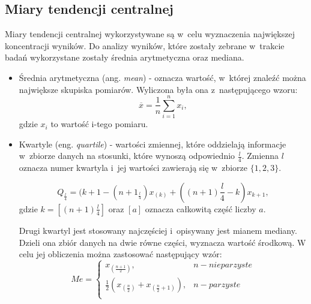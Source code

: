 \documentclass[a4paper,12pt,numbers=noenddot]{report}
\begin{document}
\subsection{Miary tendencji centralnej}
Miary tendencji centralnej wykorzystywane są w~celu wyznaczenia największej koncentracji wyników. Do analizy wyników, które zostały zebrane w~trakcie badań wykorzystane zostały średnia arytmetyczna oraz mediana.
\begin{itemize}
\item
Średnia arytmetyczna (ang. \textit{mean}) - oznacza wartość, w~której znaleźć można największe skupiska pomiarów. 
Wyliczona była ona z~następującego wzoru:
\begin{equation}
\label{eq_mean}
\overline{x} = \frac{1}{n}\sum_{i=1}^{n}x_{i},
\end{equation}
gdzie $x_{i}$ to wartość i-tego pomiaru.

\item
Kwartyle (eng. \textit{quartile}) - wartości zmiennej, które oddzielają informacje w~zbiorze danych na stosunki, które wynoszą odpowiednio $\frac{l}{4}$. Zmienna $l$ oznacza numer kwartyla i~jej wartości zawierają się w~zbiorze  $\{1,2,3\}$.

\begin{equation}
\label{eq_quart}
Q_{\frac{l}{4}}=(k+1-(n+1_\frac{l}{4})x_{(k)}+((n+1)\frac{l}{4}-k)x_{k+1},
\end{equation}
gdzie $k = [(n+1)\frac{l}{4}]$ oraz $[a]$ oznacza całkowitą część liczby $a$.

Drugi kwartyl jest stosowany najczęściej i~opisywany jest mianem mediany. Dzieli ona zbiór danych na dwie równe części, wyznacza wartość środkową. W celu jej obliczenia można zastosować następujący wzór:
\begin{equation}
\label{eq_median}
Me=\left\{
        \begin{array}{ll}
             x_{(\frac{n+1}{2})}, & n - nieparzyste\\
             \frac{1}{2}(x_{(\frac{n}{2})}+x_{(\frac{n}{2}+1)}), & n - parzyste\\
             \end{array}
        \right.
\end{equation}
\end{itemize}
\end{document}
